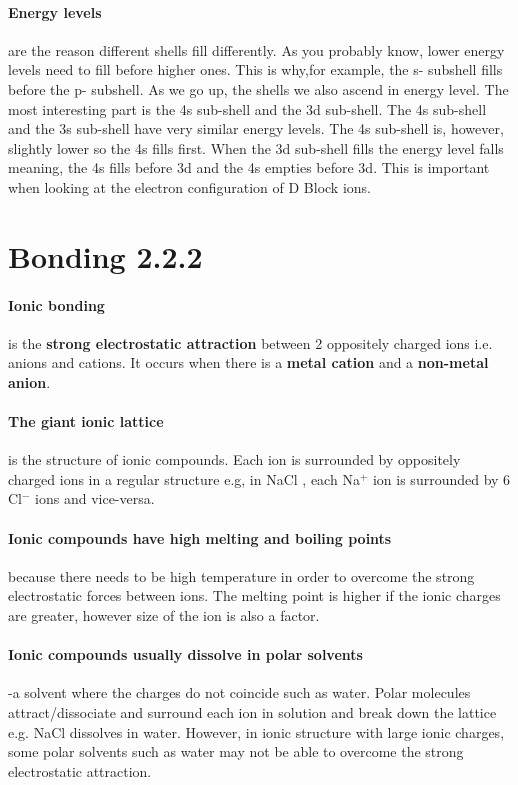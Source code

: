    \paragraph{Energy levels} are the reason different shells fill differently. 
   As you probably know, lower energy levels need to fill before higher ones.
   This is why,for example, the s- subshell fills before the p- subshell.
   As we go up, the shells we also ascend in energy level.
	The most interesting part is the 4s sub-shell and the 3d sub-shell.
	The 4s sub-shell and the 3s sub-shell have very similar energy levels.
	The 4s sub-shell is, however, slightly lower so the 4s fills first.
	When the 3d sub-shell fills the energy level falls meaning, the 4s fills before 3d and the 4s empties before 3d.
	This is important when looking at the electron configuration of D Block ions.
    \section{Bonding 2.2.2}
    \paragraph{Ionic bonding} is the \textbf{strong electrostatic attraction} between 2 oppositely charged ions i.e. anions and cations.
    It occurs when there is a \textbf{metal cation} and a \textbf{non-metal anion}.
    \paragraph{The giant ionic lattice} is the structure of ionic compounds. 
    Each ion is surrounded by oppositely charged ions in a regular structure e.g, in NaCl , each Na$^+$ ion is surrounded by 6 Cl$^-$ ions and vice-versa.
    \paragraph{Ionic compounds have high melting and boiling points} because there needs to be high temperature in order to overcome the strong electrostatic forces between ions.
    The melting point is higher if the ionic charges are greater, however size of the ion is also a factor.
    \paragraph{Ionic compounds usually dissolve in polar solvents}-a solvent where the charges do not coincide such as water. Polar molecules attract/dissociate and surround each ion in solution and break down the lattice e.g. NaCl dissolves in water.
    However, in ionic structure with large ionic charges, some polar solvents such as water may not be able to overcome the strong electrostatic attraction.
